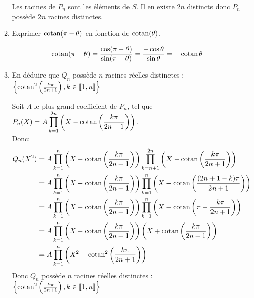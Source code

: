 \documentclass[a4paper,french,bookmarks]{article}
\def\cotan{\qopname\relax o{cotan}}
\begin{document}
\begin{enumerate}
\begin{enumerate}
        \begin{tcolorbox}[colback=black!8,colframe=black!9,boxrule=.25pt,enhanced,arc is angular,arc=0pt]
        Les racines de $P_n$ sont les éléments de $S$. Il en existe $2n$ distincts donc $P_n$ possède $2n$ racines distinctes.
        \end{tcolorbox}
        \item Exprimer $\cotan(\pi - \theta)$ en fonction de $\cotan(\theta)$.
        \begin{tcolorbox}[colback=black!8,colframe=black!9,boxrule=.25pt,enhanced,arc is angular,arc=0pt]
        $$\cotan(\pi-\theta) = \dfrac{\cos(\pi-\theta)}{\sin(\pi-\theta)}=\dfrac{-\cos \theta}{\sin \theta}=-\cotan\theta$$
        \end{tcolorbox}
        \item En déduire que $Q_n$ possède $n$ racines réelles distinctes : $\left\lbrace\cotan^2\left(\frac{k\pi}{2n+1}\right),k \in \llbracket1,n\rrbracket\right\rbrace$
        \begin{tcolorbox}[colback=black!8,colframe=black!9,boxrule=.25pt,enhanced,arc is angular,arc=0pt]
        Soit $A$ le plus grand coefficient de $P_n$, tel que $\displaystyle P_n(X)=A\prod_{k=1}^{2n}\left(X-\cotan\left(\dfrac{k\pi}{2n+1}\right)\right)$.\\
        Donc:
        \begin{align*}
            \displaystyle Q_n(X^2) &= A\prod_{k=1}^{n}\left(X-\cotan\left(\dfrac{k\pi}{2n+1}\right)\right)\prod_{k=n+1}^{2n}\left(X-\cotan\left(\dfrac{k\pi}{2n+1}\right)\right)\\
            &= A\prod_{k=1}^{n}\left(X-\cotan\left(\dfrac{k\pi}{2n+1}\right)\right)\prod_{k=1}^{n}\left(X-\cotan\left(\dfrac{(2n+1-k)\pi}{2n+1}\right)\right)\\
            &= A\prod_{k=1}^{n}\left(X-\cotan\left(\dfrac{k\pi}{2n+1}\right)\right)\prod_{k=1}^{n}\left(X-\cotan\left(\pi-\dfrac{k\pi}{2n+1}\right)\right)\\
            &= A\prod_{k=1}^{n}\left(X-\cotan\left(\dfrac{k\pi}{2n+1}\right)\right)\left(X+\cotan\left(\dfrac{k\pi}{2n+1}\right)\right)\\
            &= A\prod_{k=1}^{n}\left(X^2-\cotan^2\left(\dfrac{k\pi}{2n+1}\right)\right)
        \end{align*}
        Donc $Q_n$ possède $n$ racines réelles distinctes : $\left\lbrace\cotan^2\left(\frac{k\pi}{2n+1}\right),k \in \llbracket1,n\rrbracket\right\rbrace$
        \end{tcolorbox}
    \end{enumerate}

\end{enumerate}
\end{document}
